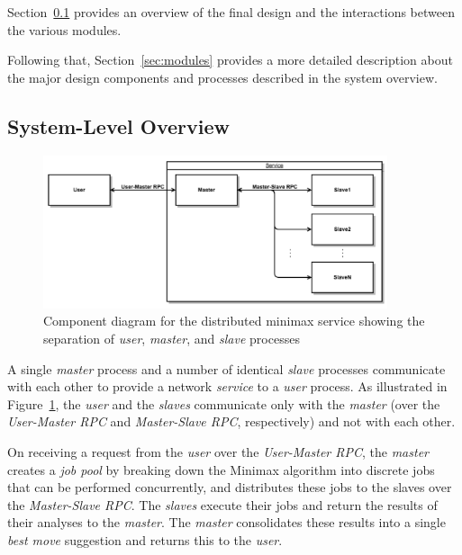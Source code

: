 \documentclass[pdftex,12pt,a4paper]{article}
\begin{document}
Section~\ref{sec:system} provides an overview of the final design and the interactions between the various modules.

Following that, Section~\ref{sec:modules} provides a more detailed description about the major design components and processes described in the system overview.

%
%
\subsection{System-Level Overview}\label{sec:system}

\begin{figure}[h]
\begin{center}
\includegraphics[width=0.9\textwidth]{img/component-diagram}
\caption{Component diagram for the distributed minimax service showing the separation of \emph{user}, \emph{master}, and \emph{slave} processes}
\label{fig:component-diagram}
\end{center}
\end{figure}

A single \emph{master} process and a number of identical \emph{slave} processes communicate with each other to provide a network \emph{service} to a \emph{user} process. As illustrated in Figure~\ref{fig:component-diagram}, the \emph{user} and the \emph{slaves} communicate only with the \emph{master} (over the \emph{User-Master RPC} and \emph{Master-Slave RPC}, respectively) and not with each other.

On receiving a request from the \emph{user} over the \emph{User-Master RPC}, the \emph{master} creates a \emph{job pool} by breaking down the Minimax algorithm into discrete jobs that can be performed concurrently, and distributes these jobs to the slaves over the \emph{Master-Slave RPC}. The \emph{slaves} execute their jobs and return the results of their analyses to the \emph{master}. The \emph{master} consolidates these results into a single \emph{best move} suggestion and returns this to the \emph{user}.
\end{document}
